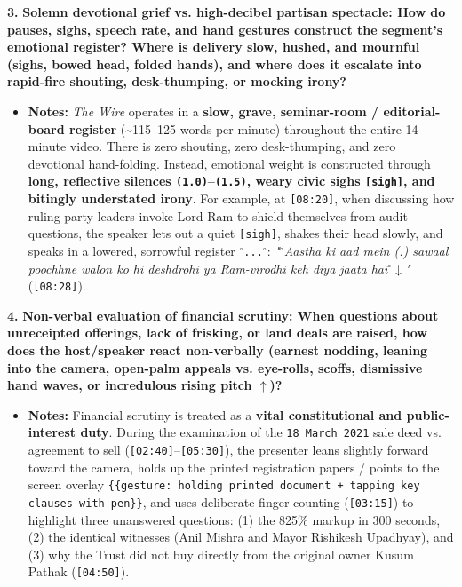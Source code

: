 \documentclass[10pt,a4paper]{article}
\begin{document}
\noindent\textbf{3.} \textbf{Solemn devotional grief vs. high-decibel partisan spectacle: How do pauses, sighs, speech rate, and hand gestures construct the segment's emotional register? Where is delivery slow, hushed, and mournful (sighs, bowed head, folded hands), and where does it escalate into rapid-fire shouting, desk-thumping, or mocking irony?}\par\smallskip
\begin{itemize}
  \item \textbf{Notes:}
\textit{The Wire} operates in a \textbf{slow, grave, seminar-room / editorial-board register} (\textasciitilde{}115--125 words per minute) throughout the entire 14-minute video. There is zero shouting, zero desk-thumping, and zero devotional hand-folding. Instead, emotional weight is constructed through \textbf{long, reflective silences \texttt{(1.0)}--\texttt{(1.5)}, weary civic sighs \texttt{[sigh]}, and bitingly understated irony}. For example, at \texttt{[08:20]}, when discussing how ruling-party leaders invoke Lord Ram to shield themselves from audit questions, the speaker lets out a quiet \texttt{[sigh]}, shakes their head slowly, and speaks in a lowered, sorrowful register \texttt{$^\circ$...$^\circ$}: \textit{"$^\circ$Aastha ki aad mein (.) sawaal poochhne walon ko hi deshdrohi ya Ram-virodhi keh diya jaata hai$^\circ$$\downarrow$"} (\texttt{[08:28]}).\par\smallskip
\end{itemize}

\noindent\textbf{4.} \textbf{Non-verbal evaluation of financial scrutiny: When questions about unreceipted offerings, lack of frisking, or land deals are raised, how does the host/speaker react non-verbally (earnest nodding, leaning into the camera, open-palm appeals vs. eye-rolls, scoffs, dismissive hand waves, or incredulous rising pitch $\uparrow$)?}\par\smallskip
\begin{itemize}
  \item \textbf{Notes:}
Financial scrutiny is treated as a \textbf{vital constitutional and public-interest duty}. During the examination of the \texttt{18 March 2021} sale deed vs. agreement to sell (\texttt{[02:40]}--\texttt{[05:30]}), the presenter leans slightly forward toward the camera, holds up the printed registration papers / points to the screen overlay \texttt{\{\{gesture: holding printed document + tapping key clauses with pen\}\}}, and uses deliberate finger-counting (\texttt{[03:15]}) to highlight three unanswered questions: (1) the 825\% markup in 300 seconds, (2) the identical witnesses (Anil Mishra and Mayor Rishikesh Upadhyay), and (3) why the Trust did not buy directly from the original owner Kusum Pathak (\texttt{[04:50]}).\par\smallskip
\end{itemize}
\end{document}

